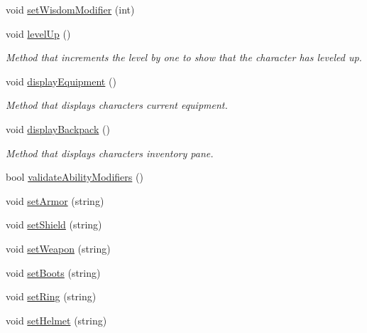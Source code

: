 \begin{DoxyCompactItemize}
\item 
void \hyperlink{class_character_af3e55f3f6018cf490471993ebcd95110}{set\+Wisdom\+Modifier} (int)
\item 
\hypertarget{class_character_aaaffb44b62eb70df0e545700c6011210}{}\label{class_character_aaaffb44b62eb70df0e545700c6011210} 
void \hyperlink{class_character_aaaffb44b62eb70df0e545700c6011210}{level\+Up} ()
\begin{DoxyCompactList}\small\item\em Method that increments the level by one to show that the character has leveled up. \end{DoxyCompactList}\item 
\hypertarget{class_character_a39139f003d8a88a27c8f91b0c0744834}{}\label{class_character_a39139f003d8a88a27c8f91b0c0744834} 
void \hyperlink{class_character_a39139f003d8a88a27c8f91b0c0744834}{display\+Equipment} ()
\begin{DoxyCompactList}\small\item\em Method that displays character\textquotesingle{}s current equipment. \end{DoxyCompactList}\item 
\hypertarget{class_character_a70de0e844848ee72cc7bb1c8dceef79c}{}\label{class_character_a70de0e844848ee72cc7bb1c8dceef79c} 
void \hyperlink{class_character_a70de0e844848ee72cc7bb1c8dceef79c}{display\+Backpack} ()
\begin{DoxyCompactList}\small\item\em Method that displays character\textquotesingle{}s inventory pane. \end{DoxyCompactList}\item 
bool \hyperlink{class_character_ae4953a40791d81dc7cab574aaeca7569}{validate\+Ability\+Modifiers} ()
\item 
void \hyperlink{class_character_af8a31bf573e0f2dc03e904165997bb21}{set\+Armor} (string)
\item 
void \hyperlink{class_character_af05444fdf239c036bf7cad6c5591419b}{set\+Shield} (string)
\item 
void \hyperlink{class_character_aaeee9a1f2678902c7749065a1bfabac9}{set\+Weapon} (string)
\item 
void \hyperlink{class_character_a611fea965a72947c1b53b79ee095f95e}{set\+Boots} (string)
\item 
void \hyperlink{class_character_a68653da50efcfeefca60d163bc30b419}{set\+Ring} (string)
\item 
void \hyperlink{class_character_a2e88779e8d7d6b1e9237c003b8b13d03}{set\+Helmet} (string)

\end{DoxyCompactItemize}
